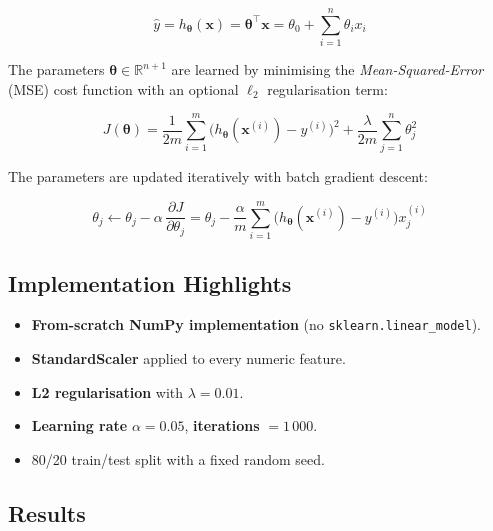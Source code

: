 \documentclass[11pt,a4paper]{article}
\begin{document}
\begin{equation}
    \hat{y} = h_{\boldsymbol{\theta}}(\mathbf{x}) = \boldsymbol{\theta}^{\top} \mathbf{x} = \theta_0 + \sum_{i=1}^{n} \theta_i x_i
\end{equation}

The parameters $\boldsymbol{\theta} \in \mathbb{R}^{n+1}$ are learned by
minimising the \emph{Mean-Squared-Error} (MSE) cost function with an
optional $\ell_2$ regularisation term:

\begin{equation}
    J(\boldsymbol{\theta}) = \frac{1}{2m} \sum_{i=1}^{m} \bigl( h_{\boldsymbol{\theta}}(\mathbf{x}^{(i)}) - y^{(i)} \bigr)^{2} + \frac{\lambda}{2m} \sum_{j=1}^{n} \theta_j^{2}
\end{equation}

The parameters are updated iteratively with batch gradient descent:

\begin{equation}
    \theta_j \leftarrow \theta_j - \alpha \, \frac{\partial J}{\partial \theta_j}
    = \theta_j - \frac{\alpha}{m} \sum_{i=1}^{m} \bigl( h_{\boldsymbol{\theta}}(\mathbf{x}^{(i)}) - y^{(i)} \bigr) x_j^{(i)}
\end{equation}

\subsection{Implementation Highlights}

\begin{itemize}[leftmargin=*, itemsep=2pt]
    \item \textbf{From-scratch NumPy implementation} (no \texttt{sklearn.linear\_model}).
    \item \textbf{StandardScaler} applied to every numeric feature.
    \item \textbf{L2 regularisation} with $\lambda = 0.01$.
    \item \textbf{Learning rate} $\alpha = 0.05$, \textbf{iterations} $= 1\,000$.
    \item 80/20 train/test split with a fixed random seed.
\end{itemize}

\subsection{Results}
\end{document}
